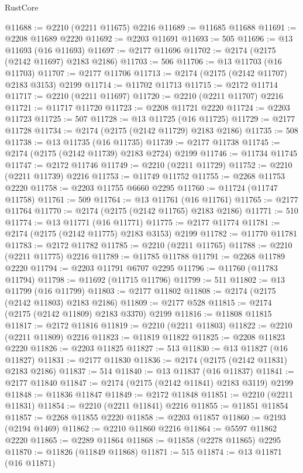 \begin{lexlean}{RustCore}
\begin{coremodule}
@11688 := @2210 (@2211 @11675) @2216
@11689 := @11685 @11688
@11691 := @2208 @11689 @2220
@11692 := @2203 @11691
@11693 := 505
@11696 := @13 @11693 (@16 @11693)
@11697 := @2177 @11696
@11702 := @2174 (@2175 (@2142 @11697) @2183 @2186)
@11703 := 506
@11706 := @13 @11703 (@16 @11703)
@11707 := @2177 @11706
@11713 := @2174 (@2175 (@2142 @11707) @2183 @3153) @2199
@11714 := @11702 @11713
@11715 := @2172 @11714
@11717 := @2210 (@2211 @11697)
@11720 := @2210 (@2211 @11707) @2216
@11721 := @11717 @11720
@11723 := @2208 @11721 @2220
@11724 := @2203 @11723
@11725 := 507
@11728 := @13 @11725 (@16 @11725)
@11729 := @2177 @11728
@11734 := @2174 (@2175 (@2142 @11729) @2183 @2186)
@11735 := 508
@11738 := @13 @11735 (@16 @11735)
@11739 := @2177 @11738
@11745 := @2174 (@2175 (@2142 @11739) @2183 @2724) @2199
@11746 := @11734 @11745
@11747 := @2172 @11746
@11749 := @2210 (@2211 @11729)
@11752 := @2210 (@2211 @11739) @2216
@11753 := @11749 @11752
@11755 := @2268 @11753 @2220
@11758 := @2203 @11755 @6660 @2295
@11760 := @11724 (@11747 @11758)
@11761 := 509
@11764 := @13 @11761 (@16 @11761)
@11765 := @2177 @11764
@11770 := @2174 (@2175 (@2142 @11765) @2183 @2186)
@11771 := 510
@11774 := @13 @11771 (@16 @11771)
@11775 := @2177 @11774
@11781 := @2174 (@2175 (@2142 @11775) @2183 @3153) @2199
@11782 := @11770 @11781
@11783 := @2172 @11782
@11785 := @2210 (@2211 @11765)
@11788 := @2210 (@2211 @11775) @2216
@11789 := @11785 @11788
@11791 := @2268 @11789 @2220
@11794 := @2203 @11791 @6707 @2295
@11796 := @11760 (@11783 @11794)
@11798 := @11692 (@11715 @11796)
@11799 := 511
@11802 := @13 @11799 (@16 @11799)
@11803 := @2177 @11802
@11808 := @2174 (@2175 (@2142 @11803) @2183 @2186)
@11809 := @2177 @528
@11815 := @2174 (@2175 (@2142 @11809) @2183 @3370) @2199
@11816 := @11808 @11815
@11817 := @2172 @11816
@11819 := @2210 (@2211 @11803)
@11822 := @2210 (@2211 @11809) @2216
@11823 := @11819 @11822
@11825 := @2208 @11823 @2220
@11826 := @2203 @11825
@11827 := 513
@11830 := @13 @11827 (@16 @11827)
@11831 := @2177 @11830
@11836 := @2174 (@2175 (@2142 @11831) @2183 @2186)
@11837 := 514
@11840 := @13 @11837 (@16 @11837)
@11841 := @2177 @11840
@11847 := @2174 (@2175 (@2142 @11841) @2183 @3119) @2199
@11848 := @11836 @11847
@11849 := @2172 @11848
@11851 := @2210 (@2211 @11831)
@11854 := @2210 (@2211 @11841) @2216
@11855 := @11851 @11854
@11857 := @2268 @11855 @2220
@11858 := @2203 @11857
@11860 := @2193 (@2194 @1469)
@11862 := @2210 @11860 @2216
@11864 := @5597 @11862 @2220
@11865 := @2289 @11864
@11868 := @11858 (@2278 @11865) @2295
@11870 := @11826 (@11849 @11868)
@11871 := 515
@11874 := @13 @11871 (@16 @11871)

\end{coremodule}
\end{lexlean}
